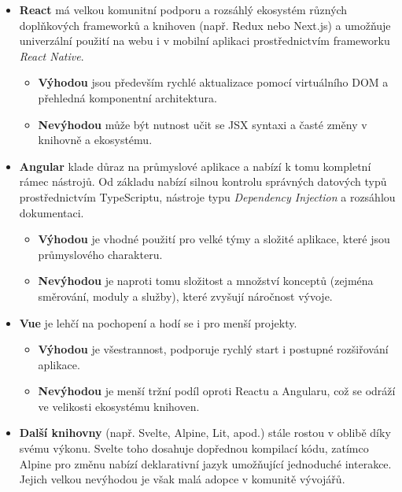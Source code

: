 \begin{itemize}
    \item \textbf{React} má velkou komunitní podporu a rozsáhlý ekosystém
        různých doplňkových frameworků a knihoven (např. Redux nebo Next.js)
        a umožňuje univerzální použití na webu i v mobilní aplikaci
        prostřednictvím frameworku \emph{React Native}.
        
        \begin{itemize}
            \item \textbf{Výhodou} jsou především rychlé aktualizace
                pomocí virtuálního DOM a přehledná komponentní
                architektura. %
            \item \textbf{Nevýhodou} může být nutnost učit se JSX syntaxi
                a časté změny v knihovně a ekosystému.
        \end{itemize}
    \item \textbf{Angular} klade důraz na průmyslové aplikace a nabízí
        k tomu kompletní rámec nástrojů. Od základu nabízí silnou kontrolu
        správných datových typů prostřednictvím TypeScriptu, nástroje
        typu \emph{Dependency Injection} a rozsáhlou dokumentaci.

        \begin{itemize}
            \item \textbf{Výhodou} je vhodné použití pro velké týmy
                a složité aplikace, které jsou průmyslového charakteru.
            \item \textbf{Nevýhodou} je naproti tomu složitost a množství
                konceptů (zejména směrování, moduly a služby), které
                zvyšují náročnost vývoje. %
        \end{itemize}
    \item \textbf{Vue} je lehčí na pochopení a hodí se i pro menší projekty.

        \begin{itemize}
            \item \textbf{Výhodou} je všestrannost, podporuje rychlý start
                i postupné rozšiřování aplikace.
            \item \textbf{Nevýhodou} je menší tržní podíl oproti Reactu
                a Angularu, což se odráží ve velikosti ekosystému knihoven.
        \end{itemize}
    \item \textbf{Další knihovny} (např. Svelte, Alpine, Lit, apod.)
        stále rostou v oblibě díky svému výkonu. Svelte toho dosahuje
        dopřednou kompilací kódu, zatímco Alpine pro změnu nabízí
        deklarativní jazyk umožňující jednoduché interakce. Jejich velkou
        nevýhodou je však malá adopce v komunitě vývojářů.
\end{itemize}

